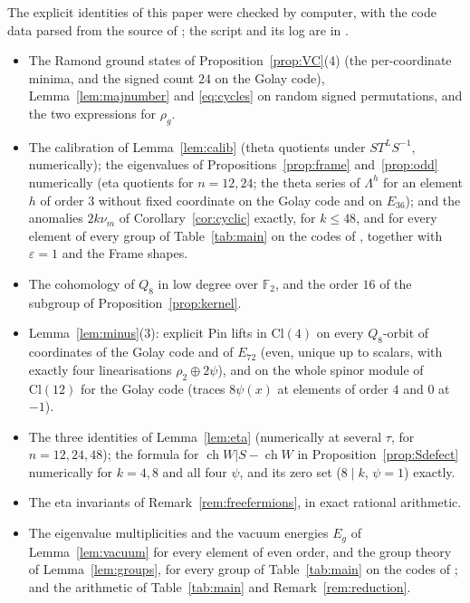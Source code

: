 \documentclass[11pt]{amsart}
\theoremstyle{definition}
\newcommand{\ch}{\operatorname{ch}}
\begin{document}
The explicit identities of this paper were checked by computer, with the code data parsed from the
source of \cite{I}; the script and its log are in \cite{repo}.
\begin{itemize}
\item The Ramond ground states of Proposition~\ref{prop:VC}(4) (the per-coordinate minima, and the signed
  count $24$ on the Golay code), Lemma~\ref{lem:majnumber} and \eqref{eq:cycles} on random signed
  permutations, and the two expressions for $\rho_g$.
\item The calibration of Lemma~\ref{lem:calib} (theta quotients under $ST^LS^{-1}$, numerically); the
  eigenvalues of Propositions~\ref{prop:frame} and~\ref{prop:odd} numerically (eta quotients for
  $n=12,24$; the theta series of $\Lambda^h$ for an element $h$ of order $3$ without fixed coordinate on
  the Golay code and on $E_{36}$); and the anomalies $2k\nu_m$ of
  Corollary~\ref{cor:cyclic} exactly, for $k\le48$, and for every element of every group of
  Table~\ref{tab:main} on the codes of \cite{I}, together with $\varepsilon=1$ and the Frame shapes.
\item The cohomology of $Q_8$ in low degree over $\mathbb F_2$, and the order $16$ of the subgroup of
  Proposition~\ref{prop:kernel}.
\item Lemma~\ref{lem:minus}(3): explicit Pin lifts in $\mathrm{Cl}(4)$ on every $Q_8$-orbit of coordinates
  of the Golay code and of $E_{72}$ (even, unique up to scalars, with exactly four
  linearisations $\rho_2\oplus2\psi$), and on the whole spinor module of $\mathrm{Cl}(12)$ for the Golay
  code (traces $8\psi(x)$ at elements of order $4$ and $0$ at $-1$).
\item The three identities of Lemma~\ref{lem:eta} (numerically at several $\tau$, for $n=12,24,48$); the
  formula for $\ch W|S-\ch W$ in Proposition~\ref{prop:Sdefect} numerically for $k=4,8$ and all four
  $\psi$, and its zero set ($8\mid k$, $\psi=1$) exactly.
\item The eta invariants of Remark~\ref{rem:freefermions}, in exact rational arithmetic.
\item The eigenvalue multiplicities and the vacuum energies $E_g$ of Lemma~\ref{lem:vacuum} for every
  element of even order, and the group theory of Lemma~\ref{lem:groups}, for every group of
  Table~\ref{tab:main} on the codes of \cite{I}; and the arithmetic of Table~\ref{tab:main} and
  Remark~\ref{rem:reduction}.
\end{itemize}
\end{document}
